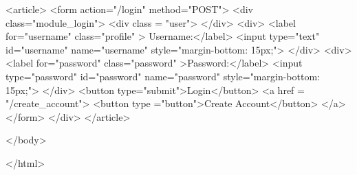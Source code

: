 \documentclass[12pt]{article} %
\begin{document}
\begin{htmlcode}[caption={Login Page HTML}]
     <article>
      <form action="/login" method="POST">
      <div class="module_login">
            <div class = "user">
            </div>
            <div>
            <label for="username" class="profile" > Username:</label>
            <input type="text" id="username" name="username" style="margin-bottom: 15px;">
            </div>
            <div>
            <label for="password" class="password" >Password:</label>
            <input type="password" id="password" name="password" style="margin-bottom: 15px;">
            </div>
            <button type="submit">Login</button>
            <a href = "/create_account"> <button type ="button">Create Account</button> </a>
         </form>
      </div>
   </article> 
   
   

</body>



</html>

\end{htmlcode}

\pagebreak
\end{document}
